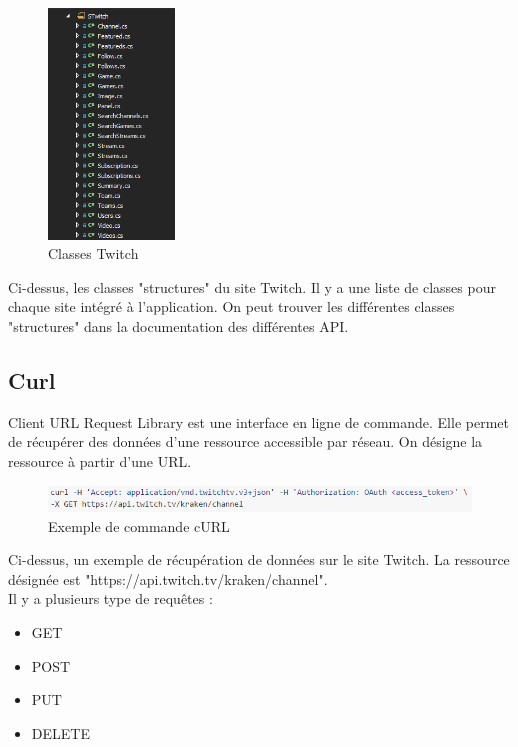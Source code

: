 \documentclass[11pt]{report} %
\begin{document}
		\begin{figure}[h]
			\center
			\includegraphics[width=0.3\textwidth]{../img/STwitch.png}
			\caption{Classes Twitch}
			\label{Twitch class}
		\end{figure}
		
		Ci-dessus, les classes "structures" du site Twitch. Il y a une liste de classes pour chaque site intégré à l'application. On peut trouver les différentes classes "structures" dans la documentation des différentes API.
		
		
		\subsection{Curl}
		Client URL Request Library est une interface en ligne de commande. Elle permet de récupérer des données d'une ressource accessible par réseau. On désigne la ressource à partir d'une URL.
		
		\begin{figure}[h]
			\center
			\includegraphics[width=1\textwidth]{../img/curl.png}
			\caption{Exemple de commande cURL}
			\label{cURL command}
		\end{figure}
		
		Ci-dessus, un exemple de récupération de données sur le site Twitch. La ressource désignée est "https://api.twitch.tv/kraken/channel".\\
		
		Il y a plusieurs type de requêtes :
		\begin{itemize}
			\item GET
			\item POST
			\item PUT
			\item DELETE
		\end{itemize}
		
\end{document}
